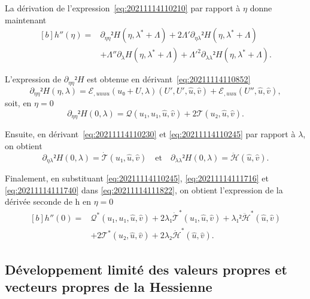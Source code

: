 \documentclass[12pt, final]{amsart}
\begin{document}
La dérivation de l'expression~\eqref{eq:20211114110210} par rapport à \(η\)
donne maintenant
\begin{equation}
  \label{eq:20211114111822}
  \begin{aligned}[b]
    h''(η)={}&\partial_{ηη}² H(η, \lambda^\ast+\Lambda)
    +2\Lambda'\partial_{η\lambda}² H(η, \lambda^\ast+\Lambda)\\
    &+\Lambda''\partial_{\lambda}H(η, \lambda^\ast+\Lambda)
    +\Lambda'^2\partial_{\lambda\lambda}²H(η, \lambda^\ast+\Lambda).
  \end{aligned}
\end{equation}

L'expression de \(\partial_{ηη}²H\) est obtenue en
dérivant~\eqref{eq:20211114110852}
\begin{equation}
  \partial_{ηη}²H(η, \lambda)
  =ℰ_{,uuuu}(u₀+U, \lambda)(U', U', \hat{u}, \hat{v})
  +ℰ_{,uuu}(U'', \hat{u}, \hat{v}),
\end{equation}
soit, en \(η=0\)
\begin{equation}
  \label{eq:20211114111716}
  \partial_{ηη}²H(0, \lambda)=\mathcal Q(u₁, u₁, \hat{u}, \hat{v})
  +2\mathcal T(u₂, \hat{u}, \hat{v}).
\end{equation}

Ensuite, en dérivant~\eqref{eq:20211114110230} et \eqref{eq:20211114110245} par
rapport à \(\lambda\), on obtient
\begin{equation}
  \label{eq:20211114111740}
  \partial_{η\lambda}²H(0, \lambda)=\dot{\mathcal T}(u₁, \hat{u}, \hat{v})
  \quad\text{et}\quad
  \partial_{\lambda\lambda}²H(0, \lambda)=\ddot{ℋ}(\hat{u}, \hat{v}).
\end{equation}

Finalement, en substituant \eqref{eq:20211114110245}, \eqref{eq:20211114111716}
et \eqref{eq:20211114111740} dans \eqref{eq:20211114111822}, on obtient
l'expression de la dérivée seconde de h en \(η=0\)
\begin{equation}
  \begin{aligned}[b]
    h''(0)={}&\mathcal Q^\ast(u₁, u₁, \hat{u}, \hat{v})
    +2\lambda₁\dot{\mathcal T}^\ast(u₁, \hat{u}, \hat{v})
    +\lambda₁²\ddot{ℋ}^\ast(\hat{u}, \hat{v})\\
    &+2\mathcal T^\ast(u₂, \hat{u}, \hat{v})
    +2\lambda₂\dot{ℋ}^\ast(\hat{u}, \hat{v}).
  \end{aligned}
\end{equation}

\subsection{Développement limité des valeurs propres et vecteurs propres de la Hessienne}
\end{document}
